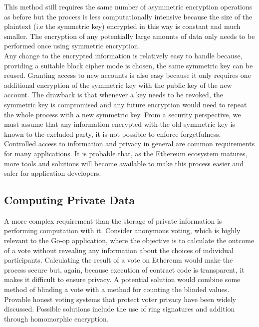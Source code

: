 This method still requires the same number of asymmetric encryption operations as before but the process is less computationally intensive because the size of the plaintext (i.e the symmetric key) encrypted in this way is constant and much smaller. The encryption of any potentially large amounts of data only needs to be performed once using symmetric encryption.\\

Any change to the encrypted information is relatively easy to handle because, providing a suitable block cipher mode is chosen, the same symmetric key can be reused. Granting access to new accounts is also easy because it only requires one additional encryption of the symmetric key with the public key of the new account. The drawback is that whenever a key needs to be revoked, the symmetric key is compromised and any future encryption would need to repeat the whole process with a new symmetric key. From a security perspective, we must assume that any information encrypted with the old symmetric key is known to the excluded party, it is not possible to enforce forgetfulness. \\

Controlled access to information and privacy in general are common requirements for many applications. It is probable that, as the Ethereum ecosystem matures, more tools and solutions will become available to make this process easier and safer for application developers. \\

\subsection{Computing Private Data}
A more complex requirement than the storage of private information is performing computation with it. Consider anonymous voting, which is highly relevant to the Go-op application, where the objective is to calculate the outcome of a vote without revealing any information about the choices of individual participants. Calculating the result of a vote on Ethereum would make the process secure but, again, because execution of contract code is transparent, it makes it difficult to ensure privacy. A potential solution would combine some method of blinding a vote with a method for counting the blinded values.\\

Provable honest voting systems that protect voter privacy have been widely discussed\cite{PrivacyBlockchain}\cite{HonestElection}. Possible solutions include the use of ring signatures\cite{liu2004linkable}\cite{tsang2005short} and addition through homomorphic encryption\cite{HomoEncryption}.\\

